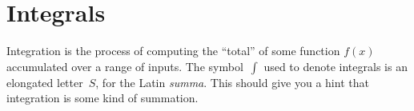 

\section{Integrals}
\label{sec:integrals}

	Integration is the process of computing the ``total'' of some function $f(x)$ accumulated over a range of inputs.
	The symbol~$\int$ used to denote integrals
	is an elongated letter~$S$, for the Latin \emph{summa}.
	This should give you a hint that integration is some kind of summation.

